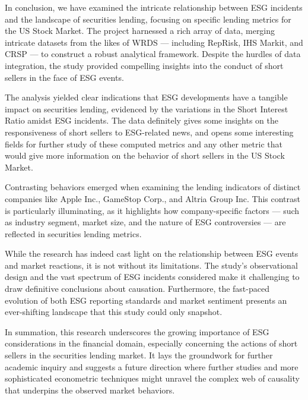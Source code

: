 In conclusion, we have examined the intricate relationship between ESG incidents and the landscape of securities lending, focusing on specific lending metrics for the US Stock Market. The project harnessed a rich array of data, merging intricate datasets from the likes of WRDS — including RepRisk, IHS Markit, and CRSP — to construct a robust analytical framework. Despite the hurdles of data integration, the study provided compelling insights into the conduct of short sellers in the face of ESG events.

The analysis yielded clear indications that ESG developments have a tangible impact on securities lending, evidenced by the variations in the Short Interest Ratio amidst ESG incidents. The data definitely gives some insights on the responsiveness of short sellers to ESG-related news, and opens some interesting fields for further study of these computed metrics and any other metric that would give more information on the behavior of short sellers in the US Stock Market.

Contrasting behaviors emerged when examining the lending indicators of distinct companies like Apple Inc., GameStop Corp., and Altria Group Inc. This contrast is particularly illuminating, as it highlights how company-specific factors — such as industry segment, market size, and the nature of ESG controversies — are reflected in securities lending metrics.

While the research has indeed cast light on the relationship between ESG events and market reactions, it is not without its limitations. The study's observational design and the vast spectrum of ESG incidents considered make it challenging to draw definitive conclusions about causation. Furthermore, the fast-paced evolution of both ESG reporting standards and market sentiment presents an ever-shifting landscape that this study could only snapshot.

In summation, this research underscores the growing importance of ESG considerations in the financial domain, especially concerning the actions of short sellers in the securities lending market. It lays the groundwork for further academic inquiry and suggests a future direction where further studies and more sophisticated econometric techniques might unravel the complex web of causality that underpins the observed market behaviors.


